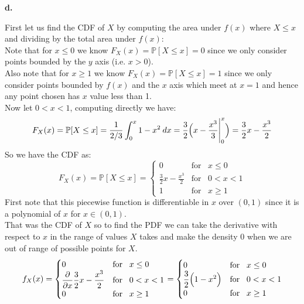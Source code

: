 \documentclass{article}
\begin{document}
\newpage
{\Large\textbf{d.}}
\begin{center}
\doublespacing
    First let us find the CDF of $X$ by computing the area under $f(x)$ where $X\leq x$ and dividing by the total area under $f(x)$:
    \\Note that for $x\leq 0$ we know $F_X (x) =\mathbb{P}[X\leq x] = 0$ since we only consider points bounded by the $y$ axis (i.e. $x > 0$).
    \\Also note that for $x\geq 1$ we know $F_X (x) =\mathbb{P}[X\leq x] = 1$ since we only consider points bounded by $f(x)$ and the $x$ axis which meet at $x = 1$ and hence any point chosen has $x$ value less than 1.
    \\Now let $0 < x < 1$, computing directly we have:
    \[F_X (x) =\mathbb{P}[X\leq x] =\frac{1}{2/3}\int_0^x 1 - x^2\: dx =\frac{3}{2}\Big{(}x -\frac{x^3}{3}\Bigg{|}_0^x\Big{)} =\frac{3}{2} x -\frac{x^3}{2}\]
    So we have the CDF as:
    \[F_X (x) =\mathbb{P}[X\leq x] =
    \begin{cases}
        0 & \mbox{for}\;\;\;x\leq 0 \\
        \frac{3}{2} x -\frac{x^3}{2} & \mbox{for}\;\;\;0 < x < 1 \\
        1 & \mbox{for}\;\;\;x\geq 1
    \end{cases}
    \]
    First note that this piecewise function is differentiable in $x$ over $(0, 1)$ since it is a polynomial of $x$ for $x\in (0,1)$.
    \\That was the CDF of $X$ so to find the PDF we can take the derivative with respect to $x$ in the range of values $X$ takes and make the density 0 when we are out of range of possible points for $X$.
    \[f_{X}(x) =
    \begin{cases}
        0 & \mbox{for}\;\;\; x\leq 0 \\
        \dfrac{\partial}{\partial x}\dfrac{3}{2} x -\dfrac{x^3}{2} & \mbox{for}\;\;\; 0 < x < 1 \\
        0 & \mbox{for}\;\;\; x\geq 1
    \end{cases}
    =
    \begin{cases}
        0 & \mbox{for}\;\;\; x\leq 0 \\
        \dfrac{3}{2}\Big{(} 1 - x^2\Big{)} & \mbox{for}\;\;\; 0 < x < 1 \\
        0 & \mbox{for}\;\;\; x\geq 1
    \end{cases}
    \]
\end{center}
\end{document}
